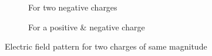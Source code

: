 \begin{figure}[htbp]
  \centering
  \begin{subfigure}[t]{0.3\textwidth}
      \caption{For two negative charges}
      \label{fig:11.6(a)}
  \end{subfigure}
  \begin{subfigure}[t]{0.3\textwidth}
      \caption{For a positive \& negative charge}
      \label{fig:11.6(b)}
  \end{subfigure}
  \caption[]{Electric field pattern for two charges of same magnitude}
  \label{fig:11.6}
\end{figure}

